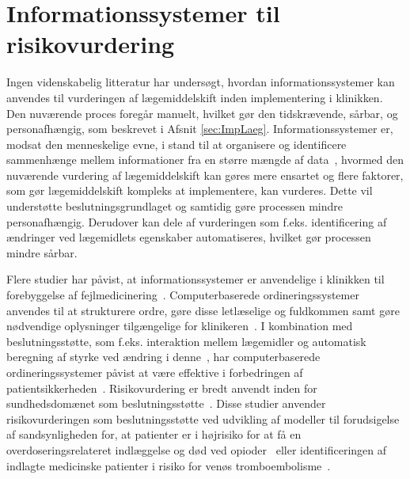\section{Informationssystemer til risikovurdering} \label{sec:Inform_Risk}
Ingen videnskabelig litteratur har undersøgt, hvordan informationssystemer kan anvendes til vurderingen af lægemiddelskift inden implementering i klinikken. Den nuværende proces foregår manuelt, hvilket gør den tidskrævende, sårbar, og personafhængig, som beskrevet i Afsnit \ref{sec:ImpLaeg}. Informationssystemer er, modsat den menneskelige evne, i stand til at organisere og identificere sammenhænge mellem informationer fra en større mængde af data~\citep{Agrawal2009}, hvormed den nuværende vurdering af lægemiddelskift kan gøres mere ensartet og flere faktorer, som gør lægemiddelskift kompleks at implementere, kan vurderes. Dette vil understøtte beslutningsgrundlaget og samtidig gøre processen mindre personafhængig. Derudover kan dele af vurderingen som f.eks. identificering af ændringer ved lægemidlets egenskaber automatiseres, hvilket gør processen mindre sårbar. 

Flere studier har påvist, at informationssystemer er anvendelige i klinikken til forebyggelse af fejlmedicinering~\citep{Agrawal2009,  Stenner2010, Fischer2008, Simpson2008, Kaushal2002, Bates2000a}. Computerbaserede ordineringssystemer anvendes til at strukturere ordre, gøre disse letlæselige og fuldkommen samt gøre nødvendige oplysninger tilgængelige for klinikeren~\citep{Agrawal2009,Bates2000a}. I kombination med beslutningsstøtte, som f.eks. interaktion mellem lægemidler og automatisk beregning af styrke ved ændring i denne~\citep{Agrawal2009}, har computerbaserede ordineringssystemer påvist at være effektive i forbedringen af patientsikkerheden~\citep{Agrawal2009, Bates2000a}. Risikovurdering er bredt anvendt inden for sundhedsdomænet som beslutningsstøtte~\citep{Geissert2018, Rawshani2018,Barbar2010}. Disse studier anvender risikovurderingen som beslutningsstøtte ved udvikling af modeller til forudsigelse af sandsynligheden for, at patienter er i højrisiko for at få en overdoseringsrelateret indlæggelse og død ved opioder~\citep{Geissert2018} eller identificeringen af indlagte medicinske patienter i risiko for venøs tromboembolisme~\citep{Barbar2010}.

